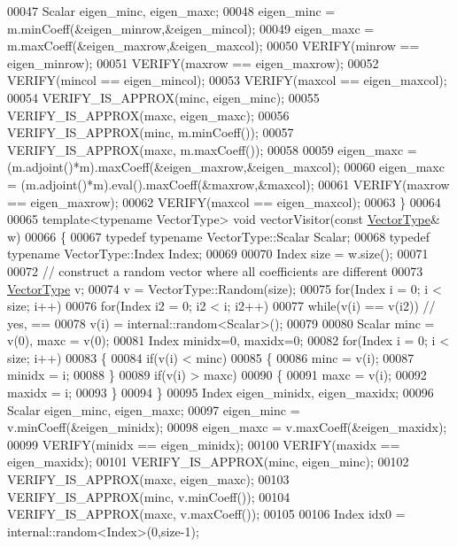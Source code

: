\begin{DoxyCode}
00047   Scalar eigen\_minc, eigen\_maxc;
00048   eigen\_minc = m.minCoeff(&eigen\_minrow,&eigen\_mincol);
00049   eigen\_maxc = m.maxCoeff(&eigen\_maxrow,&eigen\_maxcol);
00050   VERIFY(minrow == eigen\_minrow);
00051   VERIFY(maxrow == eigen\_maxrow);
00052   VERIFY(mincol == eigen\_mincol);
00053   VERIFY(maxcol == eigen\_maxcol);
00054   VERIFY\_IS\_APPROX(minc, eigen\_minc);
00055   VERIFY\_IS\_APPROX(maxc, eigen\_maxc);
00056   VERIFY\_IS\_APPROX(minc, m.minCoeff());
00057   VERIFY\_IS\_APPROX(maxc, m.maxCoeff());
00058 
00059   eigen\_maxc = (m.adjoint()*m).maxCoeff(&eigen\_maxrow,&eigen\_maxcol);
00060   eigen\_maxc = (m.adjoint()*m).eval().maxCoeff(&maxrow,&maxcol);
00061   VERIFY(maxrow == eigen\_maxrow);
00062   VERIFY(maxcol == eigen\_maxcol);
00063 \}
00064 
00065 \textcolor{keyword}{template}<\textcolor{keyword}{typename} VectorType> \textcolor{keywordtype}{void} vectorVisitor(\textcolor{keyword}{const} \hyperlink{struct_vector_type}{VectorType}& w)
00066 \{
00067   \textcolor{keyword}{typedef} \textcolor{keyword}{typename} VectorType::Scalar Scalar;
00068   \textcolor{keyword}{typedef} \textcolor{keyword}{typename} VectorType::Index Index;
00069 
00070   Index size = w.size();
00071 
00072   \textcolor{comment}{// construct a random vector where all coefficients are different}
00073   \hyperlink{struct_vector_type}{VectorType} v;
00074   v = VectorType::Random(size);
00075   \textcolor{keywordflow}{for}(Index i = 0; i < size; i++)
00076     \textcolor{keywordflow}{for}(Index i2 = 0; i2 < i; i2++)
00077       \textcolor{keywordflow}{while}(v(i) == v(i2)) \textcolor{comment}{// yes, ==}
00078         v(i) = internal::random<Scalar>();
00079   
00080   Scalar minc = v(0), maxc = v(0);
00081   Index minidx=0, maxidx=0;
00082   \textcolor{keywordflow}{for}(Index i = 0; i < size; i++)
00083   \{
00084     \textcolor{keywordflow}{if}(v(i) < minc)
00085     \{
00086       minc = v(i);
00087       minidx = i;
00088     \}
00089     \textcolor{keywordflow}{if}(v(i) > maxc)
00090     \{
00091       maxc = v(i);
00092       maxidx = i;
00093     \}
00094   \}
00095   Index eigen\_minidx, eigen\_maxidx;
00096   Scalar eigen\_minc, eigen\_maxc;
00097   eigen\_minc = v.minCoeff(&eigen\_minidx);
00098   eigen\_maxc = v.maxCoeff(&eigen\_maxidx);
00099   VERIFY(minidx == eigen\_minidx);
00100   VERIFY(maxidx == eigen\_maxidx);
00101   VERIFY\_IS\_APPROX(minc, eigen\_minc);
00102   VERIFY\_IS\_APPROX(maxc, eigen\_maxc);
00103   VERIFY\_IS\_APPROX(minc, v.minCoeff());
00104   VERIFY\_IS\_APPROX(maxc, v.maxCoeff());
00105   
00106   Index idx0 = internal::random<Index>(0,size-1);

\end{DoxyCode}
